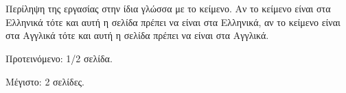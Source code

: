\chapter*{\abstractname}
\addstarredchapter{\abstractname} %
\makecseabstract


\noindent Περίληψη της εργασίας στην ίδια γλώσσα με το κείμενο.
Αν το κείμενο είναι στα Ελληνικά τότε και αυτή η σελίδα πρέπει να είναι στα Ελληνικά, αν το κείμενο είναι στα Αγγλικά τότε και αυτή η σελίδα πρέπει να είναι στα Αγγλικά.

\bigskip

\noindent Προτεινόμενο: 1/2 σελίδα.

\noindent Μέγιστο: 2 σελίδες.